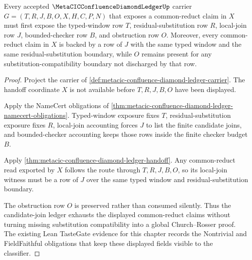 \begin{theorem}
\label{thm:metacic-confluence-diamond-ledger-candidate-join}
Every accepted $\MetaCICConfluenceDiamondLedgerUp$ carrier $G=(T,R,J,B,O,X,H,C,P,N)$ that exposes a common-reduct claim in $X$ must first expose the typed-window row $T$, residual-substitution row $R$, local-join row $J$, bounded-checker row $B$, and obstruction row $O$. Moreover, every common-reduct claim in $X$ is backed by a row of $J$ with the same typed window and the same residual-substitution boundary, while $O$ remains present for any substitution-compatibility boundary not discharged by that row.
\end{theorem}
\begin{proof}
Project the carrier of \autoref{def:metacic-confluence-diamond-ledger-carrier}. The handoff coordinate $X$ is not available before $T,R,J,B,O$ have been displayed.

Apply the NameCert obligations of \autoref{thm:metacic-confluence-diamond-ledger-namecert-obligations}. Typed-window exposure fixes $T$, residual-substitution exposure fixes $R$, local-join accounting forces $J$ to list the finite candidate joins, and bounded-checker accounting keeps those rows inside the finite checker budget $B$.

Apply \autoref{thm:metacic-confluence-diamond-ledger-handoff}. Any common-reduct read exported by $X$ follows the route through $T,R,J,B,O$, so its local-join witness must be a row of $J$ over the same typed window and residual-substitution boundary.

The obstruction row $O$ is preserved rather than consumed silently. Thus the candidate-join ledger exhausts the displayed common-reduct claims without turning missing substitution compatibility into a global Church--Rosser proof. The existing Lean TasteGate evidence for this chapter records the Nontrivial and FieldFaithful obligations that keep these displayed fields visible to the classifier.
\end{proof}

